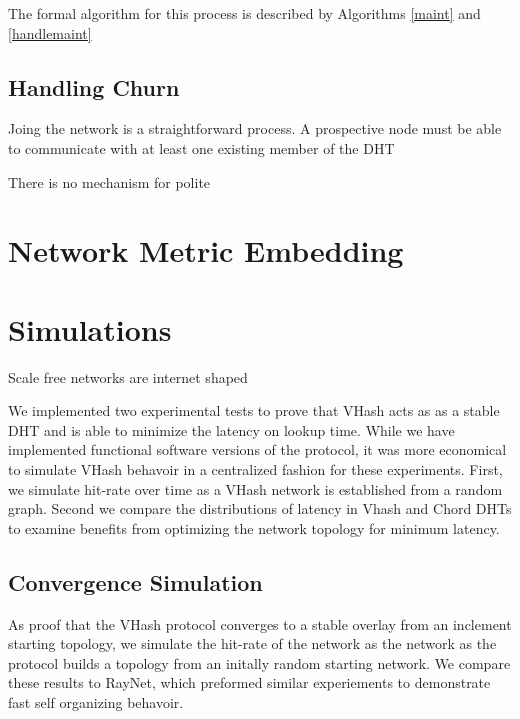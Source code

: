 \documentclass{IEEEtran}
\begin{document}
The formal algorithm for this process is described by Algorithms \ref{maint} and \ref{handlemaint}


\subsection{Handling Churn}
Joing the network is a straightforward process.  A prospective node must be able to communicate with at least one existing member of the DHT

There is no mechanism for polite 


\section{Network Metric Embedding}

\section{Simulations}
Scale free networks are internet shaped\cite{cohen2000resilience}

We implemented two experimental tests to prove that VHash acts as as a stable DHT and is able to minimize the latency on lookup time.
While we have implemented functional software versions of the protocol, it was more economical to simulate VHash behavoir in a centralized fashion for these experiments.
First, we simulate hit-rate over time as a VHash network is established from a random graph.
Second we compare the distributions of latency in Vhash and Chord DHTs to examine benefits from optimizing the network topology for minimum latency.

\subsection{Convergence Simulation}
As proof that the VHash protocol converges to a stable overlay from an inclement starting topology, we simulate the hit-rate of the network as the network as the protocol builds a topology from an initally random starting network.
We compare these results to RayNet, which preformed similar experiements to demonstrate fast self organizing behavoir.
\end{document}

